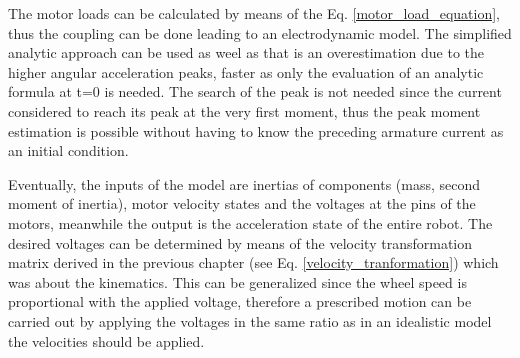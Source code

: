 \documentclass[12pt,english,twoside]{article}
\begin{document}
The motor loads can be calculated by means of the Eq. \ref{motor_load_equation}, thus the coupling can be done leading to an electrodynamic model. The simplified analytic approach can be used as weel as that is an overestimation due to the higher angular acceleration peaks, faster as only the evaluation of an analytic formula at t=0 is needed. The search of the peak is not needed since the current considered to reach its peak at the very first moment, thus the peak moment estimation is possible without having to know the preceding armature current as an initial condition. 

Eventually, the inputs of the model are inertias of components (mass, second moment of inertia), motor velocity states and the voltages at the pins of the motors, meanwhile the output is the acceleration state of the entire robot. The desired voltages can be determined by means of the velocity transformation matrix derived in the previous chapter (see Eq. \ref{velocity_tranformation}) which was about the kinematics. This can be generalized since the wheel speed is proportional with the applied voltage, therefore a prescribed motion can be carried out by applying the voltages in the same ratio as in an idealistic model the velocities should be applied.
\end{document}
